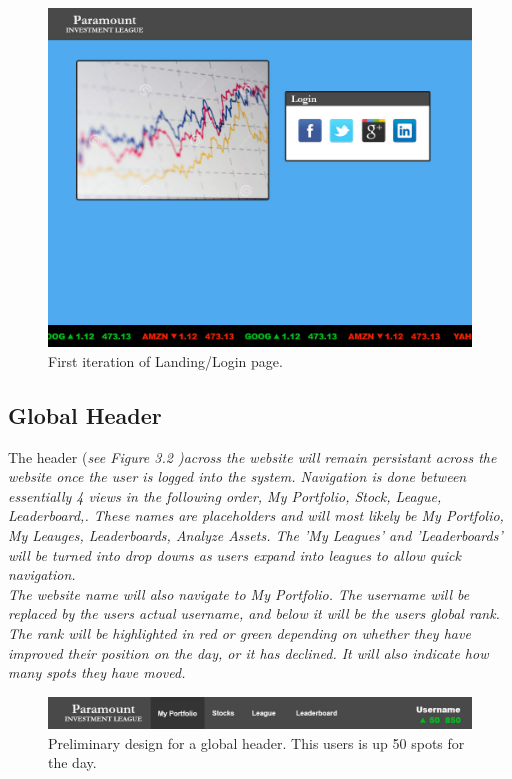 \begin{figure}
\centering
\includegraphics[width=5.5in]{./img/mock/login.jpg}
\caption{First iteration of Landing/Login page.}
\end{figure}

\subsection{Global Header}

The header (\em see Figure 3.2 \em)across the website will remain persistant across the
website once the user is logged into the system.  Navigation is done between essentially
4 views in the following order, My Portfolio, Stock, League, Leaderboard,.  These names
are placeholders and will most likely be My Portfolio, My Leauges, Leaderboards,
Analyze Assets. The 'My Leagues' and 'Leaderboards' will be turned into drop downs as
users expand into leagues to allow quick navigation.\\

The website name will also navigate to My Portfolio. The username will be replaced by the
users actual username, and below it will be the users global rank.  The rank will be
highlighted in red or green depending on whether they have improved their position on the
day, or it has declined.  It will also indicate how many spots they have moved.\\

\begin{figure}
\centering
\includegraphics[width=5.5in]{./img/mock/topbar.jpg} %
\caption{Preliminary design for a global header. This users is up 50 spots for the day.}
\end{figure}

